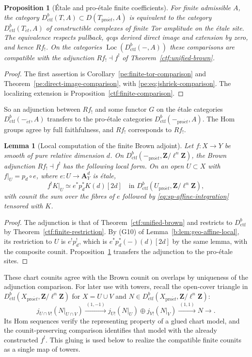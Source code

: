 \documentclass[11pt,a4paper]{article}
\numberwithin{equation}{section}
\newtheorem{lemma}[theorem]{Lemma}
\newtheorem{proposition}[theorem]{Proposition}
\theoremstyle{definition}
\theoremstyle{remark}
\newcommand{\Loc}{\operatorname{Loc}}
\newcommand{\et}{\acute{e}t}
\newcommand{\proet}{\mathrm{pro}\acute{e}t}
\newcommand{\Dctf}{D^b_{\mathrm{ctf}}}
\begin{document}
\begin{proposition}[\'Etale and pro-\'etale finite coefficients]
\label{prop:sp-et-proet}
For finite admissible $A$, the category
$\Dctf(T,A)\subset D(T_{\proet},A)$ is equivalent to the category
$\Dctf(T_{\et},A)$ of constructible complexes of finite Tor amplitude on
the \'etale site. The equivalence respects pullback, qcqs derived
direct image and extension by zero, and hence $Rf_!$.
On the categories $\Loc(\Dctf(-,A))$ these comparisons are compatible with
the adjunction $Rf_!\dashv f^!$ of Theorem~\ref{ctf:unified-brown}.
\end{proposition}
\begin{proof}
The first assertion is Corollary~\ref{pe:finite-tor-comparison} and
Theorem~\ref{pe:direct-image-comparison}, with
\eqref{pe:eq:jshriek-comparison}. The localizing extension is
Proposition~\ref{ctf:finite-comparison}.
\end{proof}

So an adjunction between $Rf_!$ and some functor $G$ on the \'etale
categories $\Dctf(-_{\et},A)$ transfers to the pro-\'etale categories
$\Dctf(-_{\proet},A)$. The Hom groups agree by full faithfulness, and
$Rf_!$ corresponds to $Rf_!$.

\begin{lemma}[Local computation of the finite Brown adjoint]
\label{lem:sp-finite-existence}
Let $f:X\to Y$ be smooth of pure relative dimension $d$.
On $\Dctf(-_{\proet},\mathbf Z/\ell^n\mathbf Z)$, the Brown
adjunction $Rf_!\dashv f^!$ has the following local form.
On an open $U\subset X$ with
$f|_U=p_d\circ e$, where $e:U\to\mathbf A^d_Y$ is \'etale,
\[
 f^!K|_U\simeq e^*p_{d}^*K(d)[2d]
 \quad\text{in }\Dctf(U_{\proet},\mathbf Z/\ell^n\mathbf Z),
\]
with counit the sum over the fibres of $e$ followed by
\eqref{eq:sp-affine-integration} tensored with $K$.
\end{lemma}
\begin{proof}
The adjunction is that of
Theorem~\ref{ctf:unified-brown} and restricts to $\Dctf$ by
Theorem~\ref{ctf:finite-restriction}. By (G10) of
Lemma~\ref{b:lem:geo-affine-local}, its restriction to $U$ is $e^!p_d^!$,
which is $e^*p_d^*(-)(d)[2d]$ by the same lemma, with the composite
counit. Proposition~\ref{prop:sp-et-proet} transfers the adjunction to the
pro-\'etale sites.
\end{proof}

These chart counits agree with the Brown counit on overlaps by
uniqueness of the adjunction comparison. For later use with towers,
recall the open-cover triangle in $\Dctf(X_{\proet},\mathbf Z/\ell^n\mathbf Z)$
for $X=U\cup V$ and $N\in\Dctf(X_{\proet},\mathbf Z/\ell^n\mathbf Z)$:
\begin{equation}\label{eq:sp-open-cover}
 j_{U\cap V!}(N|_{U\cap V})
 \xrightarrow{\ (1,-1)\ }
 j_{U!}(N|_U)\oplus j_{V!}(N|_V)
 \xrightarrow{\ (1,1)\ }N\longrightarrow{} .
\end{equation}
Its Hom sequences verify the representing property of a glued
chart model, and the counit-preserving comparison identifies that model
with the already constructed $f^!$. This gluing is used below to realize
the compatible finite counits as a single map of towers.
\end{document}
